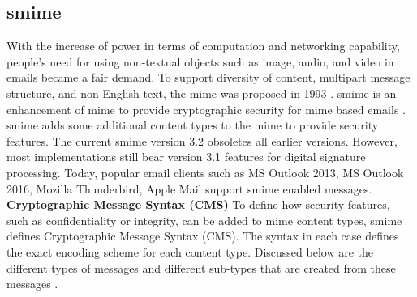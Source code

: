 \subsection{\acrfull{smime}}
\label{chap:analysis-smime}

With the increase of power in terms of computation and networking capability, people's need for using non-textual objects such as image, audio, and video in emails became a fair demand. To support diversity of content, multipart message structure, and non-English text, the \acrfull{mime} was proposed in 1993 \cite{rfc1521}. \acrfull{smime} is an enhancement of \acrshort{mime} to provide cryptographic security for \acrshort{mime} based emails \cite{rfc1521}. %
\acrshort{smime} adds some additional content types to the \acrshort{mime} to provide security features. The current \acrshort{smime} version 3.2 obsoletes all earlier versions. However, most implementations still bear version 3.1 features for digital signature processing. Today, popular email clients such as MS Outlook 2013, MS Outlook 2016, Mozilla Thunderbird, Apple Mail support \acrshort{smime} enabled messages.
\newline
\newline
\textbf{Cryptographic Message Syntax (CMS)}
\newline
To define how security features, such as confidentiality or integrity, can be added to \acrshort{mime} content types, \acrshort{smime} defines Cryptographic Message Syntax (CMS). The syntax in each case defines the exact encoding scheme for each content type. Discussed below are the different types of messages and different sub-types that are created from these messages \cite{PKCS-7}.
